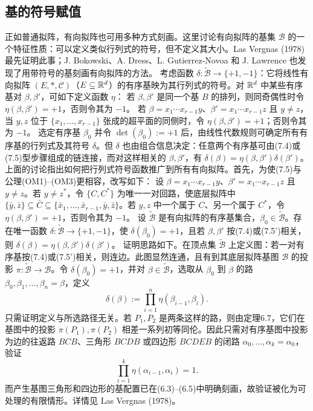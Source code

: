 \subsection*{基的符号赋值}
正如普通拟阵，有向拟阵也可用多种方式刻画。这里讨论有向拟阵的基集 $\mathcal B$ 的一个特征性质：可以定义类似行列式的符号，但不定义其大小。Las Vergnas (1978) 最先证明此事；J. Bokowski、A. Dress、L. Gutierrez-Novoa 和 J. Lawrence 也发现了用带符号的基刻画有向拟阵的方法。
考虑函数 $\delta:\widetilde{\mathcal B}\to\{+1,-1\}$：它将线性有向拟阵 $(E,*,\mathcal C)$（$E\subseteq\mathbb R^d$）的有序基映为其行列式的符号。对 $\mathbb R^d$ 中某些有序基对 $\beta,\beta'$，可如下定义函数 $\eta$：
若 $\beta,\beta'$ 是同一个基 $B$ 的排列，则同奇偶性时令 $\eta(\beta,\beta')=+1$，否则令其为 $-1$。
若 $\beta=x_1\cdots x_{r-1}y$、$\beta'=x_1\cdots x_{r-1}z$ 且 $y\ne z$，当 $y,z$ 位于 $\{x_1,\ldots,x_{r-1}\}$ 张成的超平面的同侧时，令 $\eta(\beta,\beta')=+1$；否则令其为 $-1$。
选定有序基 $\beta_0$ 并令 $\det(\beta_0):=+1$ 后，由线性代数规则可确定所有有序基的行列式及其符号 $\delta$。但 $\delta$ 也由组合信息决定：任意两个有序基可由(7.4)或(7.5)型步骤组成的链连接，而对这样相关的 $\beta,\beta'$，有 $\delta(\beta)=\eta(\beta,\beta')\delta(\beta')$。
上面的讨论指出如何把行列式符号函数推广到所有有向拟阵。首先，为使(7.5)与公理(OM1)--(OM3)更相容，改写如下：
设 $\beta=x_1\cdots x_{r-1}y$、$\beta'=x_1\cdots x_{r-1}z$ 且 $y\ne z$。若 $y\ne z^*$，令 $\{C,C^*\}$ 为唯一一对回路，使底层拟阵中 $\{\bar y,\bar z\}\subseteq\bar C\subseteq\{\bar x_1,\ldots,\bar x_{r-1},\bar y,\bar z\}$。若 $y,z$ 中一个属于 $C$、另一个属于 $C^*$，令 $\eta(\beta,\beta')=+1$，否则令其为 $-1$。
设 $\widetilde{\mathcal B}$ 是有向拟阵的有序基集合，$\beta_0\in\widetilde{\mathcal B}$。存在唯一函数 $\delta:\widetilde{\mathcal B}\to\{+1,-1\}$，使 $\delta(\beta_0)=+1$，且若 $\beta,\beta'$ 按(7.4)或(7.5')相关，则 $\delta(\beta)=\eta(\beta,\beta')\delta(\beta')$。
证明思路如下。在顶点集 $\widetilde{\mathcal B}$ 上定义图：若一对有序基按(7.4)或(7.5')相关，则连边。此图显然连通，且有到其底层拟阵基图 $\mathcal B$ 的投影 $\pi:\widetilde{\mathcal B}\to\mathcal B$。令 $\delta(\beta_0)=+1$，并对 $\beta\in\widetilde{\mathcal B}$，选取从 $\beta_0$ 到 $\beta$ 的路 $\beta_0,\beta_1,\ldots,\beta_n=\beta$，定义
\[\delta(\beta):=\prod_{i=1}^n\eta(\beta_{i-1},\beta_i).\]
只需证明定义与所选路径无关。若 $P_1,P_2$ 是两条这样的路，则由定理6.7，它们在基图中的投影 $\pi(P_1),\pi(P_2)$ 相差一系列初等同伦。因此只需对有序基图中投影为边的往返路 $BCB$、三角形 $BCDB$ 或四边形 $BCDEB$ 的闭路 $\alpha_0,\ldots,\alpha_k=\alpha_0$，验证
\[\prod_{i=1}^k\eta(\alpha_{i-1},\alpha_i)=1.\]
而产生基图三角形和四边形的基配置已在(6.3)--(6.5)中明确刻画，故验证被化为可处理的有限情形。详情见 Las Vergnas (1978)。
